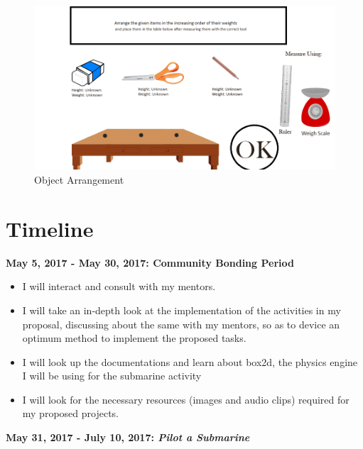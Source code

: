 \documentclass[preprint,12pt]{elsarticle}
\begin{document}
\begin{figure}[H]
\centering\includegraphics[width=1.0\linewidth]{arrangement}
\caption{Object Arrangement}
\end{figure}





\section{Timeline}
\label{S:1}

\textbf{May 5, 2017 - May 30, 2017: Community Bonding Period}

\begin{itemize}
\item I will interact and consult with my mentors.
\item I will take an in-depth look at the implementation of the activities in my proposal, discussing about the same with my mentors, so as to device an optimum method to implement the proposed tasks.
\item I will look up the documentations and learn about box2d, the physics engine I will be using for the submarine activity
\item I will look for the necessary resources (images and audio clips) required for my proposed projects.
\end{itemize}

\textbf{May 31, 2017 - July 10, 2017: \textit{Pilot a Submarine}}
\end{document}
